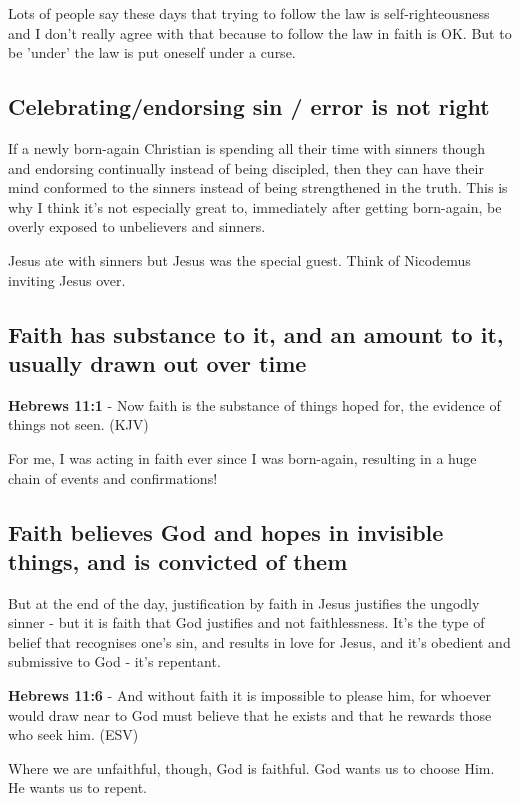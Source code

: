 \documentclass[11pt]{article}
\begin{document}
Lots of people say these days that trying to follow the law is self-righteousness and I don't really agree with that because to follow the law in faith is OK.
But to be 'under' the law is put oneself under a curse.

\subsection{Celebrating/endorsing sin / error is not right}
\label{sec:org140ff33}

If a newly born-again Christian is spending all their time with sinners though and endorsing continually instead of being discipled, then they can
have their mind conformed to the sinners instead of being strengthened in the truth. This is why I think it's not especially great to, immediately after getting born-again,
be overly exposed to unbelievers and sinners.

Jesus ate with sinners but Jesus was the special guest. Think of Nicodemus inviting Jesus over.

\subsection{Faith has substance to it, and an amount to it, usually drawn out over time}
\label{sec:org1bd3e04}
\textbf{Hebrews 11:1} - Now faith is the substance of things hoped for, the evidence of things not seen. (KJV)

For me, I was acting in faith ever since I was born-again, resulting in a huge chain of events and confirmations!

\subsection{Faith believes God and hopes in invisible things, and is convicted of them}
\label{sec:org9319539}

But at the end of the day, justification by faith in Jesus justifies the ungodly sinner - but it is faith that God justifies and not faithlessness. It's the type of belief that recognises one's sin, and results in love for Jesus, and it's obedient and submissive to God - it's repentant.

\textbf{Hebrews 11:6} - And without faith it is impossible to please him, for whoever would draw near to God must believe that he exists and that he rewards those who seek him. (ESV)

Where we are unfaithful, though, God is faithful. God wants us to choose Him. He wants us to repent.
\end{document}
